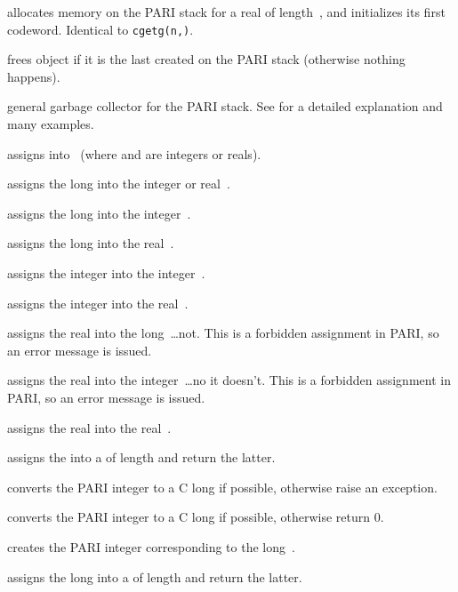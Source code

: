  allocates memory on the PARI stack for a real
of length~, and initializes its first codeword. Identical to
{\tt cgetg(n,)}.

 frees object  if it is the last created on the
PARI stack (otherwise nothing happens).

 general garbage collector
for the PARI stack. See  for a detailed explanation and
many examples.


 assigns  into~ (where
 and  are integers or reals).

 assigns the long  into the integer or
real~.

 assigns the long  into the
integer~.

 assigns the long  into the
real~.

 assigns the integer  into the
integer~.

 assigns the integer  into the
real~.

 assigns the real  into the
long~\dots not. This is a forbidden assignment in PARI, so an error
message is issued.

 assigns the real  into the
integer~\dots no it doesn't. This is a forbidden assignment in PARI,
so an error message is issued.

 assigns the real  into the real~.
\smallskip

 assigns the   into a
 of length  and return the latter.

 converts the PARI integer  to a C long if
possible, otherwise raise an exception.

 converts the PARI integer  to a C long if
possible, otherwise return $0$.

 creates the PARI integer corresponding to the
long~.

 assigns the long  into a
 of length  and return the latter.

